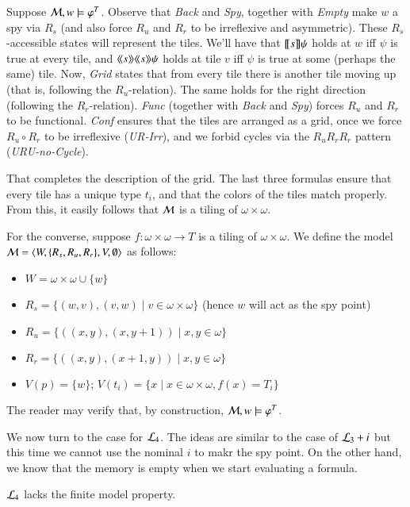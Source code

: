 \begin{pf}
Suppose $\mathcal{M},w\models\varphi^T$. Observe that \textit{Back} and
\textit{Spy}, together with \textit{Empty} make $w$ a spy
via $R_s$ (and also force
$R_u$ and $R_r$ to be irreflexive and asymmetric). These $R_s$-accessible
states will represent the tiles. We'll have that $[\![ s ]\!]\psi$
holds at $w$ iff $\psi$ is true at every tile, and
$\langle\!\langle s \rangle\!\rangle\langle\!\langle s \rangle\!\rangle\psi$ holds at tile $v$ iff $\psi$ is
true at some (perhaps the same) tile.
Now, \textit{Grid} states that from every tile there is
another tile moving up (that is, following the $R_u$-relation). The
same holds for the right direction (following the $R_r$-relation).
\textit{Func} (together with \textit{Back} and \textit{Spy}) forces $R_u$ and $R_r$ to be functional. \textit{Conf} ensures that
the tiles are arranged as a grid, once we force $R_u{\circ}R_r$ to be
irreflexive (\textit{UR-Irr}), and we forbid cycles via the $R_uR_rR_r$ pattern (\textit{URU-no-Cycle}).

That completes the description of the grid. The last
three formulas ensure that every tile has a unique type $t_i$, and that the
colors of the tiles match properly. From this, it easily follows
that $\mathcal{M}$ is a tiling of $\omega\times\omega$.

For the converse, suppose $f:\omega\times\omega\to T$ is a tiling of
$\omega\times\omega$. We define the model
$\mathcal{M}=\langle W,\{R_s,R_u,R_r\},V,\emptyset \rangle$ as follows:
\begin{itemize}
\item $W=\omega\times\omega \cup \{w\}$
\item $R_s=\{(w,v),(v,w)\mid v\in\omega\times\omega\}$  (hence $w$ will act as the spy
point)
\item $R_u=\{((x,y),(x,y+1))\mid x,y\in\omega\}$
\item $R_r=\{((x,y),(x+1,y))\mid x,y\in\omega\}$
\item $V(p)=\{w\}$; $V(t_i)=\{x\mid x\in\omega\times\omega, f(x)=T_i\}$
\end{itemize}
The reader may verify that, by construction,
$\mathcal{M},w\models\varphi^T$.
\end{pf}

We now turn to the case for $\mathcal{L}_4$. The ideas are similar to the case
of $\mathcal{L}_3 + i$ but this time we cannot use the nominal $i$ to makr the
spy point.  On the other hand, we know that the memory is empty when we
start evaluating a formula.


\begin{thm}\label{thm:tlme:inf}
$\mathcal{L}_4$ lacks the finite model property.
\end{thm}

